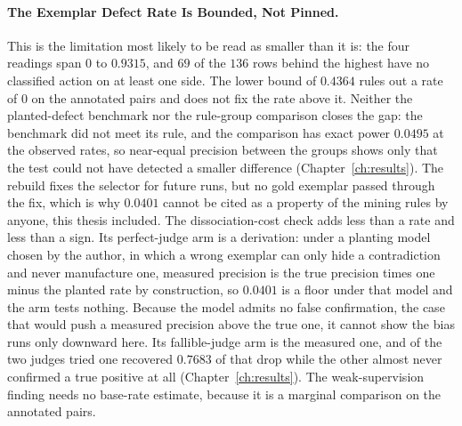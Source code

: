 \paragraph{The Exemplar Defect Rate Is Bounded, Not Pinned.} This is the limitation most
likely to be read as smaller than it is: the four readings span $0$ to $0.9315$, and $69$ of the $136$ rows behind the highest have no
classified action on at least one side. The lower bound of $0.4364$ rules out a rate of $0$ on the annotated pairs and does not fix the rate above it. Neither the planted-defect benchmark nor the
rule-group comparison closes the gap: the benchmark did not meet its rule, and the
comparison has exact power $0.0495$ at the observed rates, so near-equal precision
between the groups shows only that the test could not have detected a smaller
difference (Chapter~\ref{ch:results}). The rebuild fixes the
selector for future runs, but no gold exemplar passed through the fix, which is why $0.0401$ cannot be cited as a property of the mining rules by anyone, this thesis included. The dissociation-cost check adds less than a rate and less than a
sign. Its perfect-judge arm is a derivation: under a planting model chosen by the author, in
which a wrong exemplar can only hide a contradiction and never manufacture one, measured
precision is the true precision times one minus the planted rate by construction, so $0.0401$
is a floor under that model and the arm tests nothing. Because the model admits no false
confirmation, the case that would push a measured precision above the true one, it cannot show
the bias runs only downward here. Its fallible-judge arm is the measured one, and of the two
judges tried one recovered $0.7683$ of that drop while the other almost never confirmed a true
positive at all (Chapter~\ref{ch:results}). The weak-supervision finding needs no base-rate estimate,
because it is a marginal comparison on the annotated pairs.

